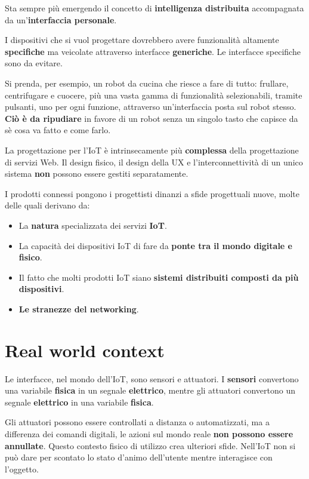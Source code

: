 \documentclass[a4paper,11pt,oneside]{book}
\begin{document}
Sta sempre più emergendo il concetto di \textbf{intelligenza distribuita} accompagnata da un'\textbf{interfaccia personale}.

I dispositivi che si vuol progettare dovrebbero avere funzionalità altamente \textbf{specifiche} ma veicolate attraverso interfacce \textbf{generiche}. Le interfacce specifiche sono da evitare.

Si prenda, per esempio, un robot da cucina che riesce a fare
di tutto: frullare, centrifugare e cuocere, più una vasta gamma di funzionalità selezionabili, tramite pulsanti, uno per ogni funzione, attraverso un'interfaccia posta sul robot stesso. \textbf{Ciò è da ripudiare} in favore di un robot senza un singolo tasto che capisce da sè cosa va fatto e come farlo.

La progettazione per l'IoT è intrinsecamente più \textbf{complessa} della progettazione di servizi Web. Il design fisico, il design della UX e l'interconnettività di un unico sistema \textbf{non} possono essere gestiti separatamente.

I prodotti connessi pongono i progettisti dinanzi a sfide progettuali nuove, molte delle quali derivano da:

\begin{itemize}
	\item La \textbf{natura} specializzata dei servizi \textbf{IoT}.
	\item La capacità dei dispositivi IoT di fare da \textbf{ponte tra il mondo digitale e fisico}.
	\item Il fatto che molti prodotti IoT siano \textbf{sistemi distribuiti composti da più dispositivi}.
	\item \textbf{Le stranezze del networking}.
\end{itemize}

\pagebreak

\section{Real world context}
Le interfacce, nel mondo dell'IoT, sono sensori e attuatori. I \textbf{sensori} convertono una variabile \textbf{fisica} in un segnale \textbf{elettrico}, mentre gli
attuatori convertono un segnale\textbf{ elettrico} in una variabile \textbf{fisica}.

Gli attuatori possono essere controllati a distanza o automatizzati, ma a differenza dei comandi digitali, le azioni sul mondo reale \textbf{non possono essere annullate}.
Questo contesto fisico di utilizzo crea ulteriori sfide. Nell'IoT non si può dare per
scontato lo stato d'animo dell'utente mentre interagisce con l'oggetto.
\end{document}
